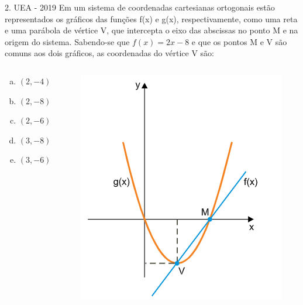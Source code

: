 \documentclass[11pt]{beamer}
\begin{document}
\begin{frame}{2. UEA - 2019}
    Em um sistema de coordenadas cartesianas ortogonais estão representados os gráficos das funções f(x) e g(x), respectivamente, como uma reta e uma parábola de vértice V, que intercepta o eixo das abscissas no ponto M e na origem do sistema. Sabendo-se que $f(x) = 2x - 8$ e que os pontos M e V são comuns aos dois gráficos, as coordenadas do vértice V são:

    \begin{columns}
        \begin{column}{0.4\textwidth}
            \begin{enumerate}[a)]
                \item $(2,-4)$ %
                \item $(2,-8)$
                \item $(2,-6)$
                \item $(3,-8)$
                \item $(3,-6)$
            \end{enumerate}
        \end{column}

        \begin{column}{0.45\textwidth}
            \centering
            \includegraphics[width=0.8\linewidth]{imagens/uea-macro-2019.png}
        \end{column}
    \end{columns}
\end{frame}
\end{document}
